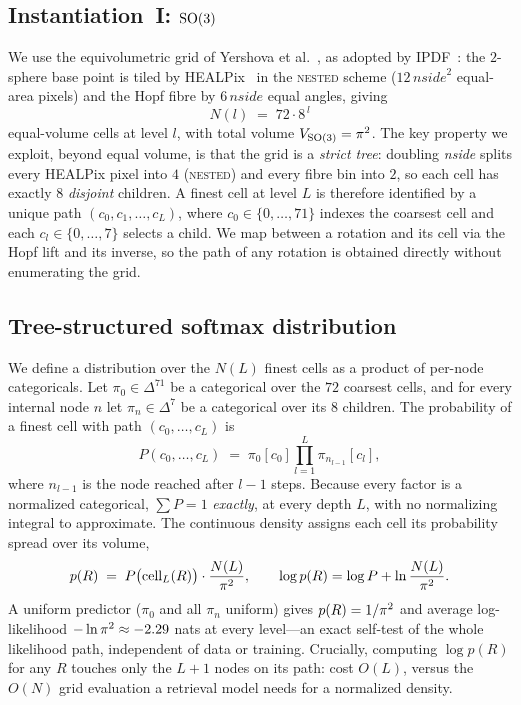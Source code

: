 \subsection{Instantiation~I: \texorpdfstring{$\mathrm{SO}(3)$}{SO(3)}}
\label{sec:grid}

We use the equivolumetric grid of Yershova et al.~\cite{yershova2010so3grids}, as adopted by
IPDF~\cite{murphy2021ipdf}: the $2$-sphere base point is tiled by
HEALPix~\cite{gorski2005healpix} in the \textsc{nested} scheme ($12\,\textit{nside}^2$
equal-area pixels) and the Hopf fibre by $6\,\textit{nside}$ equal angles, giving
\begin{equation}
  N(l) \;=\; 72 \cdot 8^{\,l}
\end{equation}
equal-volume cells at level $l$, with total volume $V_{\mathrm{SO}(3)}=\pi^2$. The key
property we exploit, beyond equal volume, is that the grid is a \emph{strict
tree}: doubling \textit{nside} splits every HEALPix pixel into $4$ (\textsc{nested})
and every fibre bin into $2$, so each cell has exactly $8$ \emph{disjoint}
children. A finest cell at level $L$ is therefore identified by a unique path
$(c_0, c_1, \dots, c_L)$, where $c_0 \in \{0,\dots,71\}$ indexes the coarsest cell
and each $c_l \in \{0,\dots,7\}$ selects a child. We map between a rotation and
its cell via the Hopf lift and its inverse, so the path of any rotation is
obtained directly without enumerating the grid.

\subsection{Tree-structured softmax distribution}
\label{sec:dist}

We define a distribution over the $N(L)$ finest cells as a product of per-node
categoricals. Let $\pi_0 \in \Delta^{71}$ be a categorical over the $72$ coarsest
cells, and for every internal node $n$ let $\pi_n \in \Delta^{7}$ be a categorical
over its $8$ children. The probability of a finest cell with path
$(c_0,\dots,c_L)$ is
\begin{equation}
  P(c_0,\dots,c_L) \;=\; \pi_0[c_0] \prod_{l=1}^{L} \pi_{n_{l-1}}[c_l],
  \label{eq:treeprob}
\end{equation}
where $n_{l-1}$ is the node reached after $l-1$ steps. Because every factor is a
normalized categorical, $\sum P = 1$ \emph{exactly}, at every depth $L$, with no
normalizing integral to approximate. The continuous density assigns each cell its
probability spread over its volume,
\begin{equation}
  p(R) \;=\; P\big(\mathrm{cell}_L(R)\big)\cdot \frac{N(L)}{\pi^2},
  \qquad
  \log p(R) = \log P + \ln\frac{N(L)}{\pi^2}.
  \label{eq:density}
\end{equation}
A uniform predictor ($\pi_0$ and all $\pi_n$ uniform) gives
$p(R)=1/\pi^2$ and average log-likelihood $-\ln\pi^2 \approx -2.29$ nats at every
level---an exact self-test of the whole likelihood path, independent of data or
training. Crucially, computing $\log p(R)$ for any $R$ touches only the $L{+}1$
nodes on its path: cost $O(L)$, versus the $O(N)$ grid evaluation a retrieval
model needs for a normalized density.

